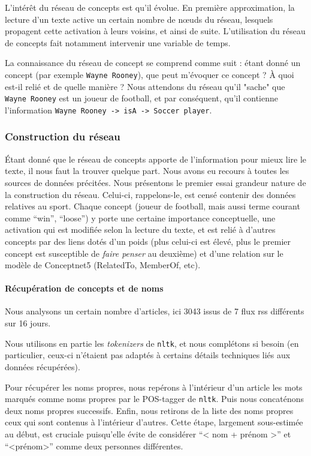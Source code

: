 \documentclass[a4paper, 12pt]{article}
\newcommand{\pyt}[1]{\texttt{#1}}%
\newcommand{\ang}[1]{\textit{#1}}%
\begin{document}
L'intérêt du réseau de concepts est qu'il évolue. En première approximation, la lecture d'un texte active un certain nombre de nœuds du réseau, lesquels propagent cette activation à leurs voisins, et ainsi de suite. L'utilisation du réseau de concepts fait notamment intervenir une variable de temps.

La connaissance du réseau de concept se comprend comme suit : étant donné un concept (par exemple \verb|Wayne Rooney|), que peut m'évoquer ce concept ? À quoi est-il relié et de quelle manière ? Nous attendons du réseau qu'il "sache" que \verb|Wayne Rooney| est un joueur de football, et par conséquent, qu'il contienne l'information \verb|Wayne Rooney -> isA -> Soccer player|.

\subsubsection{Construction du réseau}

Étant donné que le réseau de concepts apporte de l'information pour mieux lire le texte, il nous faut la trouver quelque part. Nous avons eu recours à toutes les sources de données précitées. Nous présentons le premier essai grandeur nature de la construction du réseau. Celui-ci, rappelons-le, est censé contenir des données relatives au sport. Chaque concept (joueur de football, mais aussi terme courant comme ``win'', ``loose'') y porte une certaine importance conceptuelle, une activation qui est modifiée selon la lecture du texte, et est relié à d'autres concepts par des liens dotés d'un poids (plus celui-ci est élevé, plus le premier concept est susceptible de \textit{faire penser} au deuxième) et d'une relation sur le modèle de Conceptnet5 (RelatedTo, MemberOf, etc).


\paragraph{Récupération de concepts et de noms}

Nous analysons un certain nombre d'articles, ici 3043 issus de 7 flux rss différents sur 16 jours.

Nous utilisons en partie les \ang{tokenizers} de \pyt{nltk}, et nous complétons si besoin (en particulier, ceux-ci n'étaient pas adaptés à certains détails techniques liés aux données récupérées).

Pour récupérer les noms propres, nous repérons à l'intérieur d'un article les mots marqués comme noms propres par le POS-tagger de \pyt{nltk}. Puis nous concaténons deux noms propres successifs. Enfin, nous retirons de la liste des noms propres ceux qui sont contenus à l'intérieur d'autres. Cette étape, largement sous-estimée au début, est cruciale puisqu'elle évite de considérer ``< nom + prénom >'' et ``<prénom>'' comme deux personnes différentes.
\end{document}
